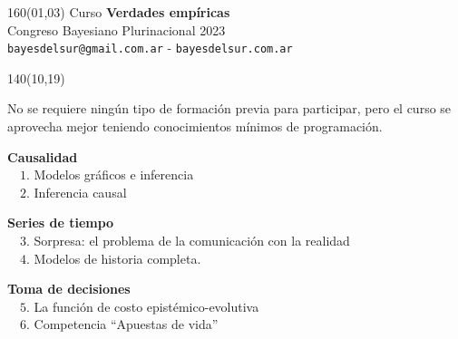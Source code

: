 \documentclass[shownotes,aspectratio=169]{beamer}
\begin{document}
\begin{frame}

\begin{textblock}{160}(01,03)\centering
\textcolor{black!85}{{\large
\large Curso \textbf{Verdades empíricas} \\[-0.1cm] \footnotesize Congreso Bayesiano Plurinacional 2023}} \\ \scriptsize \texttt{bayesdelsur@gmail.com.ar} - \texttt{bayesdelsur.com.ar}
\end{textblock}



\begin{textblock}{140}(10,19)

\normalsize
 No se requiere ningún tipo de formación previa para participar, pero el curso se aprovecha mejor teniendo conocimientos mínimos de programación.

\vspace{0.3cm}


\normalsize \textbf{Causalidad} \\[0.1cm] \footnotesize
\ \ $1$. Modelos gráficos e inferencia \\
\ \ $2$. Inferencia causal\\

 \vspace{0.3cm}

\normalsize \textbf{Series de tiempo} \\[0.1cm] \footnotesize
\ \ $3$. Sorpresa: el problema de la comunicación con la realidad \\
\ \ $4$. Modelos de historia completa. \\

\vspace{0.3cm}

\normalsize \textbf{Toma de decisiones} \\[0.1cm] \footnotesize
\ \ $5$. La función de costo epistémico-evolutiva \\
\ \ $6$. Competencia ``Apuestas de vida'' \\

\end{textblock}

\end{frame}
\end{document}
